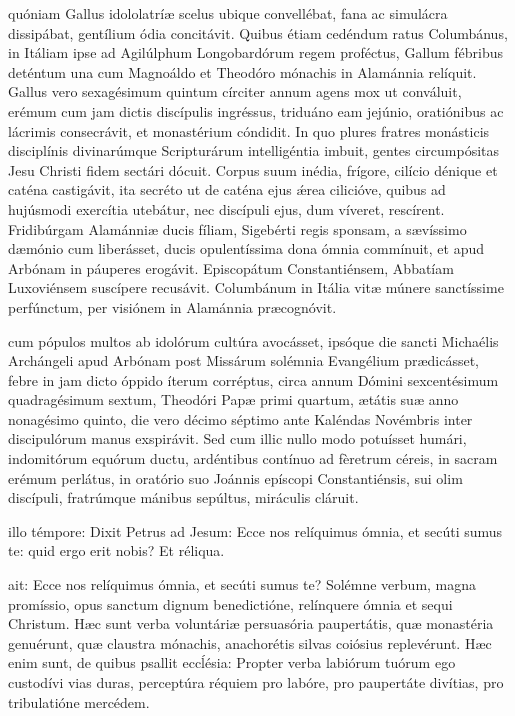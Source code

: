 \documentclass[fontsize=9pt,paper=A6,twoside,BCOR=1mm,DIV=22,headinclude]{scrarticle}
\begin{document}
\begin{multicols}{2}
 quóniam Gallus idololatríæ scelus ubique convellébat, fana ac simulácra dissipábat, gentílium ódia concitávit. Quibus étiam cedéndum ratus Columbánus, in Itáliam ipse ad Agilúlphum Longobardórum regem proféctus, Gallum fébribus deténtum una cum Magnoáldo et Theodóro mónachis in Alamánnia relíquit. Gallus vero sexagésimum quintum círciter annum agens mox ut conváluit, erémum cum jam dictis discípulis ingréssus, triduáno eam jejúnio, oratiónibus ac lácrimis consecrávit, et monastérium cóndidit. In quo plures fratres monásticis disciplínis divinarúmque Scripturárum intelligéntia imbuit, gentes circumpósitas Jesu Christi fidem sectári dócuit. Corpus suum inédia, frígore, cilício dénique et caténa castigávit, ita secréto ut de caténa ejus \'ærea cilicióve, quibus ad hujúsmodi exercítia utebátur, nec discípuli ejus, dum víveret, rescírent. Fridibúrgam Alamánniæ ducis fíliam, Sigebérti regis sponsam, a sævíssimo dæmónio cum liberásset, ducis opulentíssima dona ómnia commínuit, et apud Arbónam in páuperes erogávit. Episcopátum Constantiénsem, Abbatíam Luxoviénsem suscípere recusávit. Columbánum in Itália vitæ múnere sanctíssime perfúnctum, per visiónem in Alamánnia præcognóvit.

\RVCv 

\columnbreak
{}
 cum pópulos multos ab idolórum cultúra avocásset, ipsóque die sancti Michaélis Archángeli apud Arbónam post Missárum solémnia Evangélium prædicásset, febre in jam dicto óppido íterum corréptus, circa annum Dómini sexcentésimum quadragésimum sextum, Theodóri Papæ primi quartum, ætátis suæ anno nonagésimo quinto, die vero décimo séptimo ante Kaléndas Novémbris inter discipulórum manus exspirávit. Sed cum illic nullo modo potuísset humári, indomitórum equórum ductu, ardéntibus contínuo ad fèretrum céreis, in sacram erémum perlátus, in oratório suo Joánnis epíscopi Constantiénsis, sui olim discípuli, fratrúmque mánibus sepúltus, miráculis cláruit.

\RVCvi

 illo témpore: Dixit Petrus ad Jesum: Ecce nos relíquimus ómnia, et secúti sumus te: quid ergo erit nobis? Et réliqua.

 ait: Ecce nos relíquimus ómnia, et secúti sumus te? Solémne verbum, magna promíssio, opus sanctum dignum benedictióne, relínquere ómnia et sequi Christum. Hæc sunt verba voluntáriæ persuasória paupertátis, quæ monastéria genuérunt, quæ claustra mónachis, anachorétis silvas coiósius replevérunt. Hæc enim sunt, de quibus psallit eccĺésia: Propter verba labiórum tuórum ego custodívi vias duras, perceptúra réquiem pro labóre, pro paupertáte divítias, pro tribulatióne mercédem.


\end{multicols}
\end{document}
